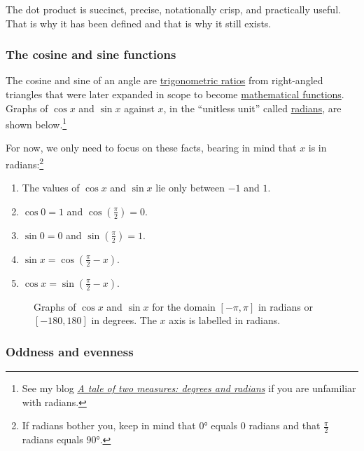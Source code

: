 \documentclass[
  a4paper,
]{article}
\begin{document}
The dot product is succinct, precise, notationally crisp, and
practically useful. That is why it has been defined and that is why it
still exists.

\hypertarget{the-cosine-and-sine-functions}{%
\subsubsection{The cosine and sine
functions}\label{the-cosine-and-sine-functions}}

The cosine and sine of an angle are
\href{https://en.wikipedia.org/wiki/Trigonometric_Ratios}{trigonometric
ratios} from right-angled triangles that were later expanded in scope to
become
\href{https://mathworld.wolfram.com/Trigonometry.html}{mathematical
functions}. Graphs of \(\cos x\) and \(\sin x\) against \(x\), in the
``unitless unit'' called
\href{https://en.wikipedia.org/wiki/Radian}{radians}, are shown
below.\footnote{See my blog
  \href{https://swanlotus.netlify.app/blogs/a-tale-of-two-measures-degrees-and-radians}{\emph{A
  tale of two measures: degrees and radians}} if you are unfamiliar with
  radians.}

For now, we only need to focus on these facts, bearing in mind that
\(x\) is in radians:\footnote{If radians bother you, keep in mind that
  \(0°\) equals \(0\) radians and that \(\frac{\pi}{2}\) radians equals
  \(90°\).}

\begin{enumerate}
\item
  The values of \(\cos x\) and \(\sin x\) lie only between \(-1\) and
  \(1\).
\item
  \(\cos 0 = 1\) and \(\cos(\frac{\pi}{2}) = 0\).
\item
  \(\sin 0 = 0\) and \(\sin(\frac{\pi}{2}) = 1\).
\item
  \(\sin x = \cos(\frac{\pi}{2} - x)\).
\item
  \(\cos x = \sin (\frac{\pi}{2} - x)\).
\end{enumerate}

\begin{figure}
\hypertarget{fig:cosx-sinx}{%
\centering

\caption{Graphs of \(\cos x\) and \(\sin x\) for the domain
\([-\pi, \pi]\) in radians or \([-180, 180]\) in degrees. The \(x\) axis
is labelled in radians.}\label{fig:cosx-sinx}
}
\end{figure}

\hypertarget{oddness-and-evenness}{%
\subsubsection{Oddness and evenness}\label{oddness-and-evenness}}
\end{document}
